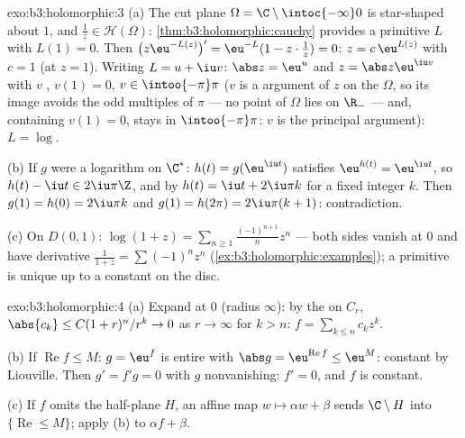 \begin{solution}{exo:b3:holomorphic:3}
(a) The cut plane $\Omega = \C\setminus\intoc{-\infty}0$ is
star-shaped about $1$, and $\frac1z \in \mathcal H(\Omega)$:
\cref{thm:b3:holomorphic:cauchy} provides a primitive $L$
with $L(1) = 0$. Then $\bigl(z\eu^{-L(z)}\bigr)' =
\eu^{-L}(1 - z\cdot\frac1z) = 0$: $z = c\,\eu^{L(z)}$ with $c
= 1$ (at $z = 1$). Writing $L = u + \iu v$: $\abs z = \eu^u$
and $z = \abs z\eu^{\iu v}$ with $v$ , $v(1) = 0$,
$v \in \intoo{-\pi}\pi$ ($v$ is a  argument of $z$
on the  $\Omega$, so its image avoids the odd
multiples of $\pi$ --- no point of $\Omega$ lies on $\R_-$
--- and, containing $v(1) = 0$, stays in $\intoo{-\pi}\pi$:
$v$ is the principal argument): $L = \log$.

(b) If $g$ were a  logarithm on $\C^*$: $h(t) =
g(\eu^{\iu t})$ satisfies $\eu^{h(t)} = \eu^{\iu t}$, so $h(t)
- \iu t \in 2\iu\pi\Z$, and by  $h(t) = \iu t +
2\iu\pi k$ for a fixed integer $k$. Then $g(1) = h(0) =
2\iu\pi k$ and $g(1) = h(2\pi) = 2\iu\pi(k + 1)$:
contradiction.

(c) On $D(0,1)$: $\log(1 + z) =
\sum_{n\geq1}\frac{(-1)^{n+1}}{n}z^n$ --- both sides vanish at
$0$ and have derivative $\frac1{1+z} = \sum(-1)^nz^n$
(\cref{ex:b3:holomorphic:examples}); a primitive is unique up
to a constant on the  disc.
\end{solution}

\begin{solution}{exo:b3:holomorphic:4}
(a) Expand at $0$ (radius $\infty$): by the 
on $C_r$, $\abs{c_k} \leq C(1 + r)^n/r^k \to 0$ as $r \to
\infty$ for $k > n$: $f = \sum_{k\leq n}c_kz^k$.

(b) If $\operatorname{Re}f \leq M$: $g = \eu^f$ is entire with
$\abs g = \eu^{\operatorname{Re}f} \leq \eu^M$: constant by
Liouville. Then $g' = f'g = 0$ with $g$ nonvanishing: $f' =
0$, and $f$ is constant.

(c) If $f$ omits the half-plane $H$, an affine map $w \mapsto
\alpha w + \beta$ sends $\C\setminus H$ into
$\{\operatorname{Re} \leq M\}$; apply (b) to $\alpha f +
\beta$.
\end{solution}

